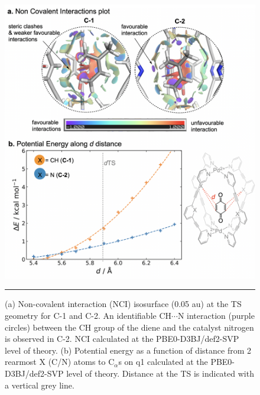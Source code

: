 \documentclass[../../main.tex]{subfiles}
\begin{document}
\begin{figure}[h!]
	\vspace{0.4cm}
	\centering
	\includegraphics[width=12cm]{3/da//figs/figS29}
	\vspace{0.2cm}
	\hrule
	\caption{(a) Non-covalent interaction (NCI) isosurface (0.05 au) at the TS geometry for C-1 and C-2. An identifiable CH$\cdots$N interaction (purple circles) between the CH group of the diene and the catalyst nitrogen is observed in C-2. NCI calculated at the PBE0-D3BJ/def2-SVP level of theory. (b) Potential energy as a function of distance from 2 rearmost X (C/N) atoms to C$_\alpha$s on q1 calculated at the PBE0-D3BJ/def2-SVP level of theory. Distance at the TS is indicated with a vertical grey line.}
	\label{fig::si_da_29}
\end{figure}
\end{document}
